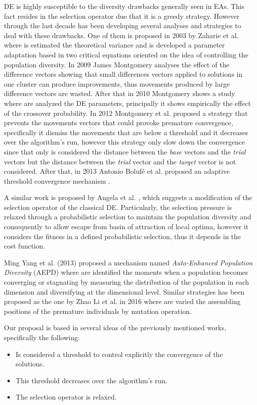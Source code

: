 DE is highly susceptible to the diversity drawbacks generally seen in EAs.
%
This fact resides in the selection operator due that it is a greedy strategy.
%
However through the last decade has been developing several analyses and strategies to deal with these drawbacks.
%
One of them is proposed in 2003 by Zaharie et al.  \cite{zaharie2003control} where is estimated the theoretical variance and is developed a parameter adaptation based in two critical equations oriented on the idea of controlling the population diversity.
%
In 2009 James Montgomery \cite{montgomery2009differential} analyses the effect of the difference vectors showing that small differences vectors applied to solutions in one cluster can produce improvements, thus movements produced by large difference vectors are wasted.
%
After that in 2010 Montgomery shows a study where are analyzed the DE parameters, principally it shows empirically the effect of the crossover probability.
%
In 2012 Montgomery et al. \cite{montgomery2012simple} proposed a strategy that prevents the movements vectors that could provoke premature convergence, specifically it dismiss the movements that are below a threshold and it decreases over the algorithm's run, however this strategy only slow down the convergence since that only is considered the distance between the \textit{base} vectors and the \textit{trial} vectors but the distance between the \textit{trial} vector and the \textit{target} vector is not considered.
%
After that, in 2013 Antonio Bolufé et al. proposed an adaptive threshold convergence mechanism \cite{bolufe2013differential}.
%

A similar work is proposed  by Angela et al. \cite{sa2008exploration}, which suggests a modification of the selection operator of the classical DE.
%
Particularly,  the selection pressure is relaxed through a probabilistic selection to maintain the population diversity and consequently to allow escape from basin of attraction of local optima, however it considers the fitness in a defined probabilistic selection, thus it depends in the cost function.
%

Ming Yang et al. (2013) \cite{yang2015differential} proposed a mechanism named \textit{Auto-Enhanced Population Diversity} (AEPD) where are identified the moments when a population becomes converging or stagnating by measuring the distribution of the population in each dimension and diversifying at the dimensional level.
%
Similar strategies has been proposed as the one by Zhao Li et al. in 2016 \cite{zhao2016differential} where are varied the assembling positions of the premature individuals by mutation operation.


Our proposal is based in several ideas of the previously mentioned works, specifically the following:
\begin{itemize}
\item Is considered a threshold to control explicitly the convergence of the solutions.
\item This threshold decreases over the algorithm's run.
\item The selection operator is relaxed. 
\end{itemize}

